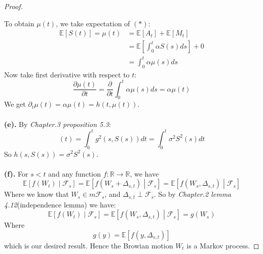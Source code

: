 \documentclass[a4paper, 10pt]{article}
\theoremstyle{definition}
\theoremstyle{hSol}
\begin{document}
\begin{proof}
\begin{itemize}
\end{itemize}
To obtain $\mu(t)$, we take expectation of $(*)$:
\begin{equation}
	\begin{split}
		\mathbb{E}\left[S(t)\right] = \mu(t) &= \mathbb{E}\left[A_t\right] + \mathbb{E}\left[M_t\right]  \\
		&= \mathbb{E}\left[ \int_0^t \alpha S(s) ds \right] + 0 \\
		& =  \int_0^t \alpha \mu(s) ds
	\end{split}
\end{equation}
Now take first derivative with respect to $t$:
\begin{equation}
	\frac{\partial \mu(t)}{\partial t} = \frac{\partial }{\partial t}\int_0^t \alpha \mu(s) ds = \alpha \mu(t)
\end{equation}
We get $\partial_t \mu(t) = \alpha \mu(t) = h(t,\mu(t))$.\\
~\\
\textbf{(e).} By \textit{Chapter.3 proposition 5.3}:
\begin{equation}
	[S,S](t) = \int_0^t g^2(s,S(s)) dt = \int_0^t \sigma^2 S^2(s) dt
\end{equation}
So $h(s,S(s)) = \sigma^2 S^2(s)$. \\
~\\
\textbf{(f).} For $s<t$ and any function $f: \mathbb{R}\to \mathbb{R}$, we have
\begin{equation}
	\mathbb{E}\left[f(W_t)\middle|\mathcal{F}_s\right] = \mathbb{E}\left[f(W_s + \Delta_{s,t})\middle|\mathcal{F}_s\right] = \mathbb{E}\left[f(W_s, \Delta_{s,t})\middle|\mathcal{F}_s\right]
\end{equation}
Where we know that $W_s \in m \mathcal{F}_s$, and $\Delta_{s,t}\perp \mathcal{F}_s$. So by \textit{Chapter.2 lemma 4.12}(independence lemma) we have:
\begin{equation}
	\mathbb{E}\left[f(W_t)\middle|\mathcal{F}_s\right]=\mathbb{E}\left[f(W_s, \Delta_{s,t})\middle|\mathcal{F}_s\right] = g(W_s)
\end{equation}
Where 
$$
g(y) = \mathbb{E}\left[f(y, \Delta_{s,t})\right]
$$
which is our desired result. Hence the Browian motion $W_t$ is a Markov process.
\end{proof}
\end{document}
